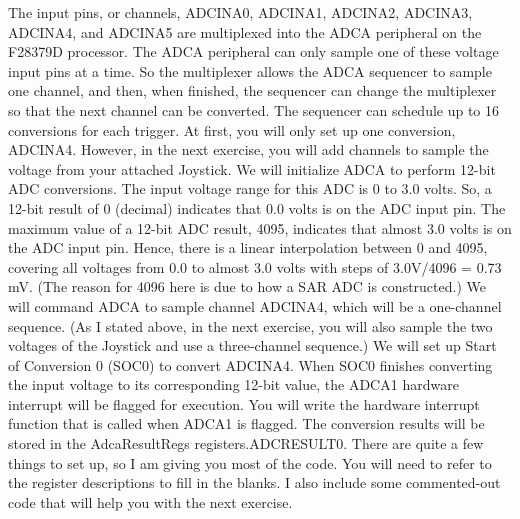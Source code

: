 \documentclass[11pt]{article}
\begin{document}
The input pins, or channels, ADCINA0, ADCINA1, ADCINA2, ADCINA3, ADCINA4, and ADCINA5 are multiplexed into the ADCA peripheral on the F28379D processor. The ADCA peripheral can only sample one of these voltage input pins at a time. So the multiplexer allows the ADCA sequencer to sample one channel, and then, when finished, the sequencer can change the multiplexer so that the next channel can be converted. The sequencer can schedule up to 16 conversions for each trigger. At first, you will only set up one conversion, ADCINA4. However, in the next exercise, you will add channels to sample the voltage from your attached Joystick.
We will initialize ADCA to perform 12-bit ADC conversions. The input voltage range for this ADC is 0 to 3.0 volts. So, a 12-bit result of 0 (decimal) indicates that 0.0 volts is on the ADC input pin. The maximum value of a 12-bit ADC result, 4095, indicates that almost 3.0 volts is on the ADC input pin. Hence, there is a linear interpolation between 0 and 4095, covering all voltages from 0.0 to almost 3.0 volts with steps of 3.0V/4096 = 0.73 mV. (The reason for 4096 here is due to how a SAR ADC is constructed.)
We will command ADCA to sample channel ADCINA4, which will be a one-channel sequence. (As I stated above, in the next exercise, you will also sample the two voltages of the Joystick and use a three-channel sequence.)  We will set up Start of Conversion 0 (SOC0) to convert ADCINA4. When SOC0 finishes converting the input voltage to its corresponding 12-bit value, the ADCA1 hardware interrupt will be flagged for execution. You will write the hardware interrupt function that is called when ADCA1 is flagged. The conversion results will be stored in the AdcaResultRegs registers.ADCRESULT0.
There are quite a few things to set up, so I am giving you most of the code. You will need to refer to the register descriptions to fill in the blanks. I also include some commented-out code that will help you with the next exercise.
\end{document}
